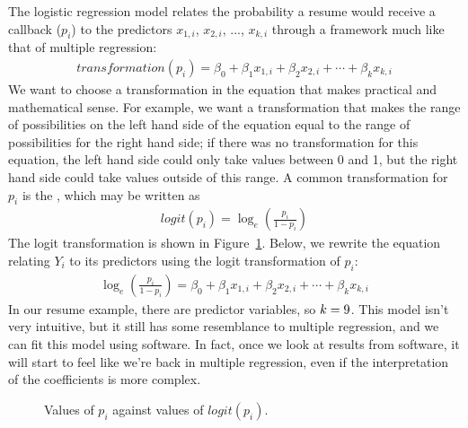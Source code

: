 The logistic regression model relates the probability
a resume would receive a callback ($p_i$) to the predictors
$x_{1,i}$, $x_{2,i}$, ..., $x_{k,i}$
through a framework much like that of multiple regression:
\begin{align}
transformation(p_{i})
  = \beta_0 +
      \beta_1x_{1,i} +
      \beta_2 x_{2,i} +
      \cdots +
      \beta_k x_{k,i}
\label{linkTransformationEquation}
\end{align}
We want to choose a transformation in the equation
that makes practical and mathematical sense.
For example, we want a transformation that makes
the range of possibilities on the left hand side
of the equation equal to the range of possibilities
for the right hand side;
if there was no transformation for this equation,
the left hand side could only take values between 0 and 1,
but the right hand side could take values outside of this
range.
A common transformation for $p_i$ is the , which may be written as
\begin{align*}
logit(p_i) = \log_{e}\left( \frac{p_i}{1-p_i} \right)
\end{align*}
The logit transformation is shown in
Figure~\ref{logitTransformationFigureHoriz}.
Below, we rewrite the equation relating $Y_i$ to its
predictors using the logit transformation of $p_i$:
\begin{align*}
\log_{e}\left( \frac{p_i}{1-p_i} \right)
  = \beta_0 +
      \beta_1 x_{1,i} +
      \beta_2 x_{2,i} +
      \cdots +
      \beta_k x_{k,i}
\end{align*}
In our resume example, there are \resNumPred{} predictor
variables, so $k = 9{}$.
This model isn't very intuitive, but it still has some
resemblance to multiple regression, and we can fit this
model using software.
In fact, once we look at results from software,
it will start to feel like we're back in multiple regression,
even if the interpretation of the coefficients is more complex.

\begin{figure}
  \centering
  \caption{Values of $p_i$ against values of $logit(p_i)$.}
  \label{logitTransformationFigureHoriz}
\end{figure}


